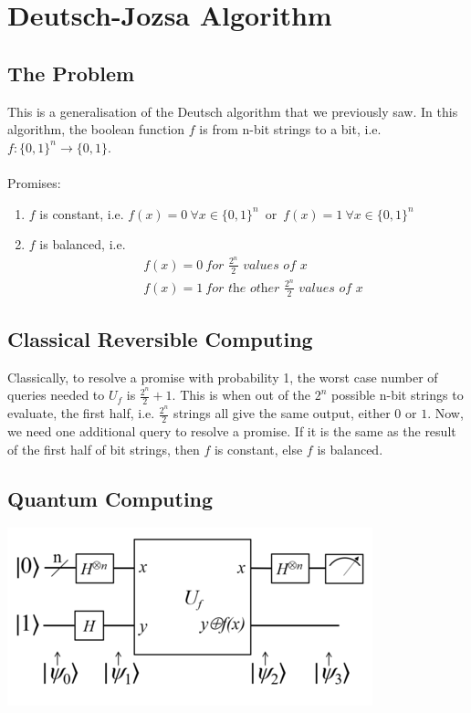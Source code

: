 \documentclass{article}
\begin{document}
\section{Deutsch-Jozsa Algorithm}
\subsection{The Problem}
This is a generalisation of the Deutsch algorithm that we previously saw. In this algorithm, the boolean function $f$ is from n-bit strings to a bit, i.e.\\
\mbox{$f: \{0,1 \}^n \rightarrow \{0,1\}$}.\\
\\
Promises:
\begin{enumerate}[label=(\roman*)]
	\item $f$ is constant, i.e. \mbox{$f(x)=0 \ \forall x \in \{0,1\}^n$ or $f(x)=1 \ \forall x \in \{0,1\}^n$}
	\item $f$ is balanced, i.e.
	      \begin{align*}
		       & f(x)=0 \ \textit{for } \frac{2^n}{2} \textit{ values of $x$}           \\
		       & f(x)=1 \ \textit{for the other } \frac{2^n}{2} \textit{ values of $x$}
	      \end{align*}
\end{enumerate}

\subsection{Classical Reversible Computing}
Classically, to resolve a promise with probability 1, the worst case number of queries needed to $U_f$ is $\frac{2^n}{2} + 1$. This is when out of the $2^n$ possible n-bit strings to evaluate, the first half, i.e. $\frac{2^n}{2}$ strings all give the same output, either $0$ or $1$. Now, we need one additional query to resolve a promise. If it is the same as the result of the first half of bit strings, then $f$ is constant, else $f$ is balanced.

\subsection{Quantum Computing}
\includegraphics{400px-Deutsch-Jozsa-algorithm-quantum-circuit.png}
\\
\end{document}
